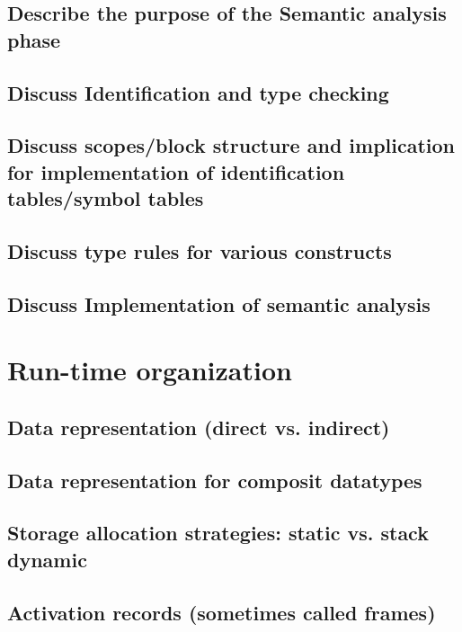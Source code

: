 \documentclass{article}
\begin{document}
\subsection{Describe the purpose of the Semantic analysis phase}

\subsection{Discuss Identification and type checking}

\subsection{Discuss scopes/block structure and implication for implementation of identification tables/symbol tables}

\subsection{Discuss type rules for various constructs}

\subsection{Discuss Implementation of semantic analysis}

\pagebreak

\section{Run-time organization}

\subsection{Data representation (direct vs. indirect)}

\subsection{Data representation for composit datatypes}

\subsection{Storage allocation strategies: static vs. stack dynamic}

\subsection{Activation records (sometimes called frames)}
\end{document}
